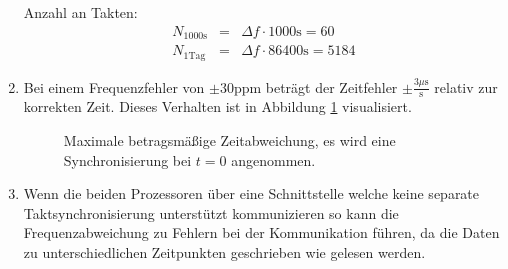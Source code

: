 \documentclass[DIN, pagenumber=false, fontsize=11pt, parskip=half]{scrartcl}
\begin{document}
\begin{enumerate}[label=\alph*)]
            Anzahl an Takten:
            \begin{eqnarray}
                N_{1000\text{s}} &=& \Delta f \cdot 1000 \text{s} = 60 \\
                N_{1 \text{Tag} } &=& \Delta f \cdot 86400 \text{s} = 5184 
            \end{eqnarray}
        \item 
            Bei einem Frequenzfehler von $\pm30$ppm beträgt der Zeitfehler
            $\pm \frac{3 \mu \text{s}}{\text{s}}$ relativ zur korrekten Zeit.
            Dieses Verhalten ist in Abbildung \ref{fig:skew} visualisiert.
            
            \begin{figure}[h]
                \centering
                \caption{Maximale betragsmäßige Zeitabweichung, es wird eine
                    Synchronisierung bei $t=0$ angenommen.}
                \label{fig:skew}
            \end{figure}
        \item
            Wenn die beiden Prozessoren über eine Schnittstelle welche keine
            separate Taktsynchronisierung unterstützt kommunizieren so kann die
            Frequenzabweichung zu Fehlern bei der Kommunikation führen, da die
            Daten zu unterschiedlichen Zeitpunkten geschrieben wie gelesen werden.
    \end{enumerate}
\end{document}
